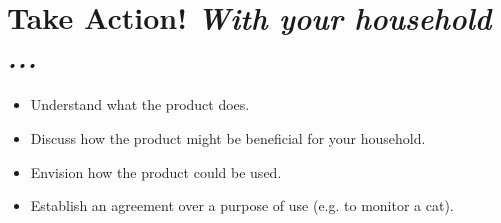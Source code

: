 \documentclass[10pt,nocombine]{leaflet}
\begin{document}
\section{\color{cobalt} Take Action! \textit{With your household ...}}
\phantom{a}\vfill
\begin{onehalfspacing}
\begin{itemize}[label=\Large\protect{},labelsep=10pt,leftmargin=40pt]
    \item \large Understand what the product does.
\end{itemize}
\begin{itemize}[label=~,labelsep=10pt,leftmargin=40pt]
    \item \large Discuss how the product might be beneficial for your household.
    \item \large Envision how the product could be used.\vspace{1ex}
\end{itemize}
\begin{itemize}[label=\Large\protect{},labelsep=10pt,leftmargin=40pt]
    \item \large Establish an agreement over a purpose of use (e.g. to monitor a cat). 
\end{itemize}
\begin{itemize}[label=~,labelsep=10pt,leftmargin=40pt]

\end{itemize}
\end{onehalfspacing}
\end{document}
